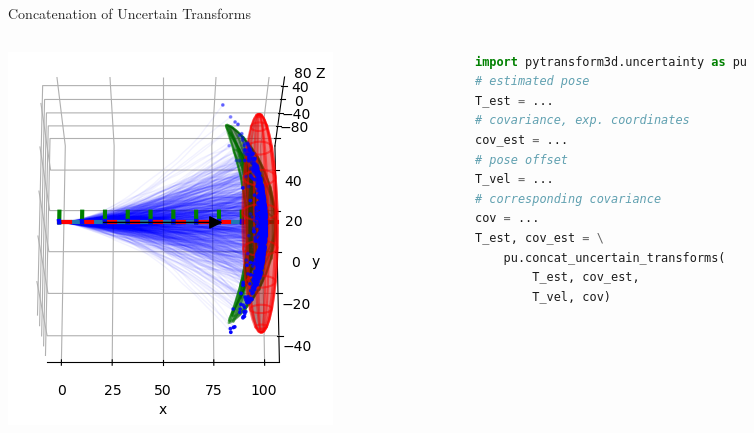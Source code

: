 \documentclass[14pt]{beamer}
\begin{document}
\begin{frame}[fragile]{Concatenation of Uncertain Transforms}
\begin{columns}
\begin{column}{0.47\textwidth}
\includegraphics[width=\textwidth]{images/state_estimation}
\end{column}
\begin{column}{0.53\textwidth}
\begin{lstlisting}[language=Python]
import pytransform3d.uncertainty as pu
# estimated pose
T_est = ...
# covariance, exp. coordinates
cov_est = ...
# pose offset
T_vel = ...
# corresponding covariance
cov = ...
T_est, cov_est = \
    pu.concat_uncertain_transforms(
        T_est, cov_est,
        T_vel, cov)
\end{lstlisting}
\end{column}
\end{columns}
\end{frame}
\end{document}
